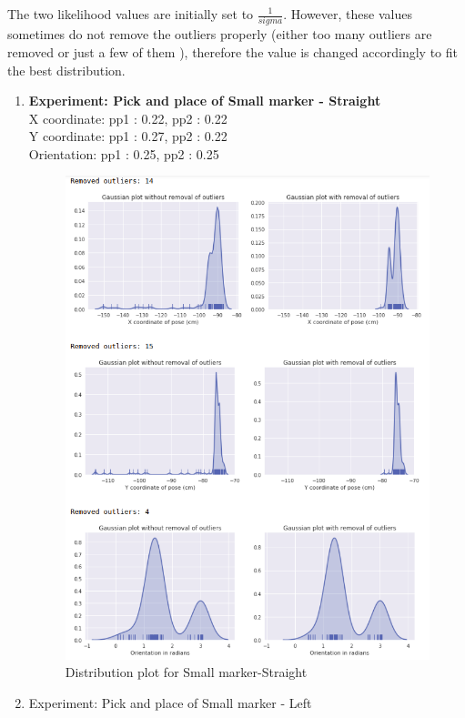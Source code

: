 \documentclass[11pt,a4paper]{article}
\begin{document}
				The two likelihood values are initially set to $\frac{1}{sigma}$. However, these values sometimes do not remove the outliers properly (either too many outliers are removed or just a few of them ), therefore the value is changed accordingly to fit the best distribution.		
				\newpage
				\begin{enumerate}
				\item\textbf{ Experiment: Pick and place of Small marker - Straight}\\
				X coordinate: pp1 : 0.22, pp2 : 0.22\\
				Y coordinate: pp1 : 0.27, pp2 : 0.22 \\
				Orientation: pp1 : 0.25, pp2 : 0.25
				\begin{figure}[H]
					\centering
					\includegraphics[scale=0.56]{small-str}	
					\caption{Distribution plot for Small marker-Straight}
				\end{figure}
				\newpage
				\item Experiment: Pick and place of Small marker - Left\\

\end{enumerate}
\end{document}
